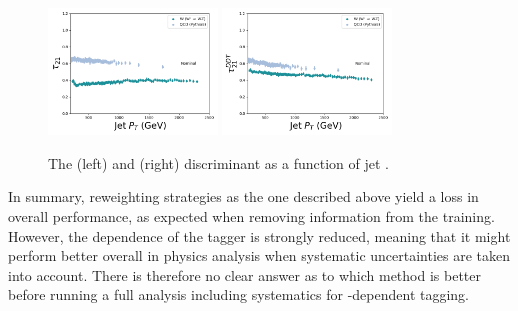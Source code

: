 \begin{figure}[h!]
\centering
\includegraphics[width=0.4\textwidth]{figures/vtagging/lola/tau21_-profile-jpt.png}
\includegraphics[width=0.4\textwidth]{figures/vtagging/lola/ddt_-profile-jpt.png}
\caption{The \nsubj (left) and \ddt (right) discriminant as a function of jet \PT.}
\label{fig:lola:nsubjcorr}
\end{figure}
In summary, reweighting strategies as the one described above yield a loss in overall performance, as expected when removing information from the training. However, the \PT dependence of the tagger is strongly reduced, meaning that it might perform better overall in physics analysis when systematic uncertainties are taken into account. There is therefore no clear answer as to which method is better before running a full analysis including systematics for \PT-dependent tagging.

